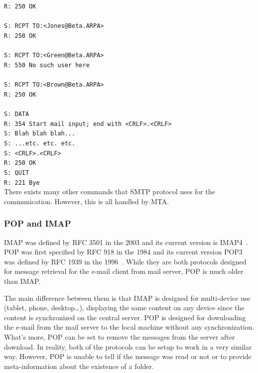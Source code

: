 \texttt{R: 250 OK}\\
\\
\texttt{S: RCPT TO:<Jones@Beta.ARPA>}\\
\texttt{R: 250 OK}\\
\\
\texttt{S: RCPT TO:<Green@Beta.ARPA>}\\
\texttt{R: 550 No such user here}\\
\\
\texttt{S: RCPT TO:<Brown@Beta.ARPA>}\\
\texttt{R: 250 OK}\\
\\
\texttt{S: DATA}\\
\texttt{R: 354 Start mail input; end with <CRLF>.<CRLF>}\\
\texttt{S: Blah blah blah...}\\
\texttt{S: ...etc. etc. etc.}\\
\texttt{S: <CRLF>.<CRLF>}\\
\texttt{R: 250 OK}\\
\texttt{S: QUIT}\\
\texttt{R: 221 Bye}\\
\label{mail-command}
There exists many other commands that SMTP protocol uses for the communication. However, this is all handled by MTA.

\subsubsection{POP and IMAP}
\label{popimap}
IMAP was defined by RFC 3501 in the 2003 and its current version is IMAP4~\cite{rfc3501}. POP was first specified by RFC 918 in the 1984 and its current version POP3 was defined by RFC 1939 in the 1996~\cite{rfc1939}. While they are both protocols designed for message retrieval for the e-mail client from mail server, POP is much older than IMAP.

The main difference between them is that IMAP is designed for multi-device use (tablet, phone, desktop\dots), displaying the same content on any device since the content is synchronized on the central server. POP is designed for downloading the e-mail from the mail server to the local machine without any synchronization. What's more, POP can be set to remove the messages from the server after download. In reality, both of the protocols can be setup to work in a very similar way. However, POP is unable to tell if the message was read or not or to provide meta-information about the existence of a folder.

